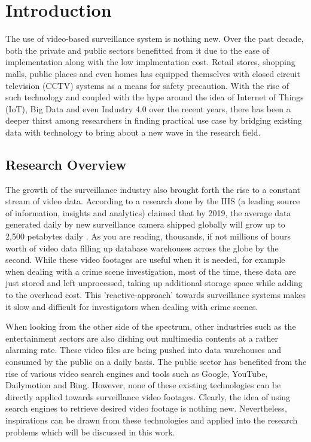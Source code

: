 \chapter{Introduction}
The use of video-based surveillance system is nothing new. Over the past decade, both the private and public sectors benefitted from it due to the ease of implementation along with the low implmentation cost.
Retail stores, shopping malls, public places and even homes has equipped themselves with closed circuit television (CCTV) systems as a means for safety precaution.
With the rise of such technology and coupled with the hype around the idea of Internet of Things (IoT), Big Data and even Industry 4.0 over the recent years, there has been a deeper thirst among researchers in finding practical use case by bridging existing data with technology to bring about a new wave in the research field.

\section{Research Overview}
\label{section:introduction}

The growth of the surveillance industry also brought forth the rise to a constant stream of video data. According to a research done by the IHS (a leading source of information, insights and analytics) claimed that by 2019, the average data generated daily by new surveillance camera shipped globally will grow up to 2,500 petabytes daily \cite{woodhouse2016big}.
As you are reading, thousands, if not millions of hours worth of video data filling up database warehouses across the globe by the second. While these video footages are useful when it is needed, for example when dealing with a crime scene investigation, most of the time, these data are just stored and left unprocessed, taking up additional storage space while adding to the overhead cost.
This 'reactive-approach' towards surveillance systems makes it slow and difficult for investigators when dealing with crime scenes.

When looking from the other side of the spectrum, other industries such as the entertainment sectors are also dishing out multimedia contents at a rather alarming rate. These video files are being pushed into data warehouses and consumed by the public on a daily basis. The public sector has benefited from the rise of various video search engines and tools such as Google, YouTube, Dailymotion and Bing. However, none of these existing technologies can be directly applied towards surveillance video footages. Clearly, the idea of using search engines to retrieve desired video footage is nothing new. Nevertheless, inspirations can be drawn from these technologies and applied into the research problems which will be discussed in this work.

